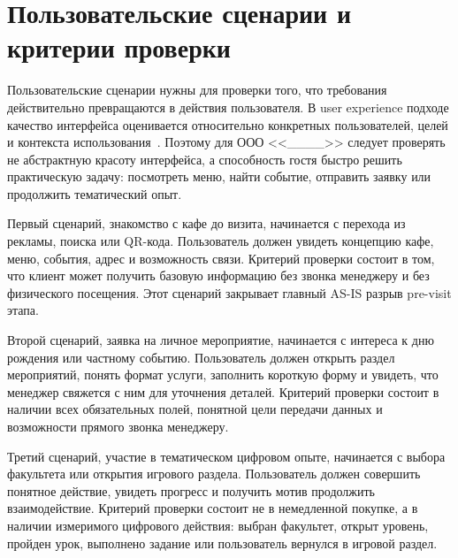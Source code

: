 \section{Пользовательские сценарии и критерии проверки}

Пользовательские сценарии нужны для проверки того, что требования действительно превращаются в действия пользователя. В user experience подходе качество интерфейса оценивается относительно конкретных пользователей, целей и контекста использования~\cite{norman2013,iso25010_2023}. Поэтому для ООО <<\_\_\_\_>> следует проверять не абстрактную красоту интерфейса, а способность гостя быстро решить практическую задачу: посмотреть меню, найти событие, отправить заявку или продолжить тематический опыт.

Первый сценарий, знакомство с кафе до визита, начинается с перехода из рекламы, поиска или QR-кода. Пользователь должен увидеть концепцию кафе, меню, события, адрес и возможность связи. Критерий проверки состоит в том, что клиент может получить базовую информацию без звонка менеджеру и без физического посещения. Этот сценарий закрывает главный AS-IS разрыв pre-visit этапа.

Второй сценарий, заявка на личное мероприятие, начинается с интереса к дню рождения или частному событию. Пользователь должен открыть раздел мероприятий, понять формат услуги, заполнить короткую форму и увидеть, что менеджер свяжется с ним для уточнения деталей. Критерий проверки состоит в наличии всех обязательных полей, понятной цели передачи данных и возможности прямого звонка менеджеру.

Третий сценарий, участие в тематическом цифровом опыте, начинается с выбора факультета или открытия игрового раздела. Пользователь должен совершить понятное действие, увидеть прогресс и получить мотив продолжить взаимодействие. Критерий проверки состоит не в немедленной покупке, а в наличии измеримого цифрового действия: выбран факультет, открыт уровень, пройден урок, выполнено задание или пользователь вернулся в игровой раздел.

